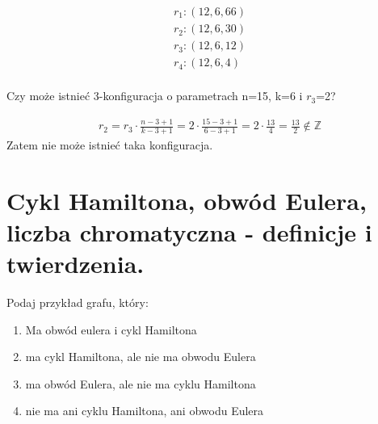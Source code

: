 \documentclass[12pt]{article}
\begin{document}
    \begin{align*}
        r_1: (12,6,66) \\
        r_2: (12,6,30) \\
        r_3: (12,6,12) \\
        r_4: (12,6,4) \\
    \end{align*}
    
    \begin{exercise}
        Czy może istnieć 3-konfiguracja o parametrach n=15, k=6 i $r_3$=2?
    \end{exercise}
    
    \begin{align*}
        r_2=r_3\cdot \frac{n-3+1}{k-3+1}=2\cdot \frac{15-3+1}{6-3+1}=2\cdot \frac{13}{4}=\frac{13}{2}\notin \mathbb{Z}
    \end{align*}
    Zatem nie może istnieć taka konfiguracja.
    

    \newpage

    \section{Cykl Hamiltona, obwód Eulera, liczba chromatyczna - definicje i twierdzenia.}

    \begin{exercise}
    Podaj przykład grafu, który:
        \begin{enumerate}
            \item Ma obwód eulera i cykl Hamiltona
            \item ma cykl Hamiltona, ale nie ma obwodu Eulera
            \item ma obwód Eulera, ale nie ma cyklu Hamiltona
            \item nie ma ani cyklu Hamiltona, ani obwodu Eulera
        \end{enumerate}
    \end{exercise}
    
\end{document}
